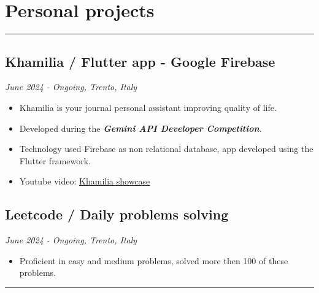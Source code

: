 \documentclass[a4paper,10pt]{article}
\begin{document}
\begin{minipage}[t]{0.25\textwidth}
    \section*{Personal projects}
    \vspace{4.2cm} %
    \rule{0.6cm}{0.3mm}
\end{minipage}
\hfill
\begin{minipage}[t]{0.75\textwidth}
     \subsection*{Khamilia / Flutter app - Google Firebase }
    \textit{June 2024 - Ongoing, Trento, Italy} \\
    \begin{itemize}[leftmargin=1cm]
        \item Khamilia is your journal personal assistant improving quality of life.
        \item Developed during the \textbf{\textit{Gemini API Developer Competition}}.
        \item Technology used Firebase as non relational database, app developed using the Flutter framework.
        \item Youtube video: \textcolor{blue}{\uline\href{https://www.youtube.com/watch?v=viXL9V_b6mo&ab_channel=pierodigia}{
        {Khamilia showcase}}}  
    \end{itemize}
    \subsection*{Leetcode / Daily problems solving }
    \textit{June 2024 - Ongoing, Trento, Italy} \\
    \begin{itemize}[leftmargin=1cm]  
        \item Proficient in easy and medium problems, solved more then 100 of these problems. 
    \end{itemize}
    \rule{\linewidth}{0.5mm}
\end{minipage}
\end{document}

